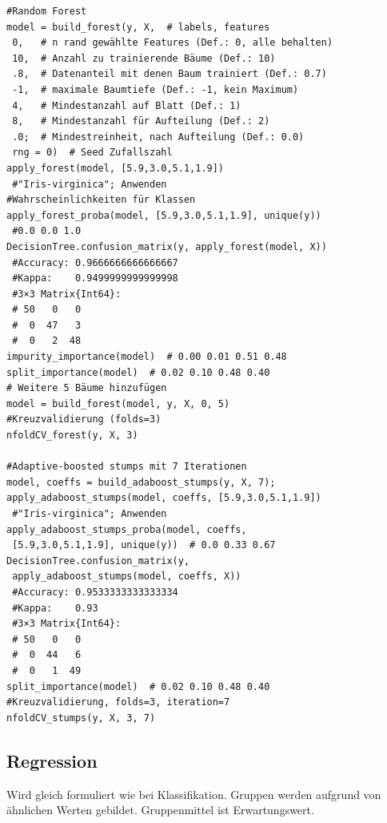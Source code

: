 \documentclass[10pt,twocolumn]{scrartcl}
\begin{document}
\begin{lstlisting}
#Random Forest
model = build_forest(y, X,  # labels, features
 0,   # n rand gewählte Features (Def.: 0, alle behalten)
 10,  # Anzahl zu trainierende Bäume (Def.: 10)
 .8,  # Datenanteil mit denen Baum trainiert (Def.: 0.7)
 -1,  # maximale Baumtiefe (Def.: -1, kein Maximum)
 4,   # Mindestanzahl auf Blatt (Def.: 1)
 8,   # Mindestanzahl für Aufteilung (Def.: 2)
 .0;  # Mindestreinheit, nach Aufteilung (Def.: 0.0)
 rng = 0)  # Seed Zufallszahl
apply_forest(model, [5.9,3.0,5.1,1.9])
 #"Iris-virginica"; Anwenden
#Wahrscheinlichkeiten für Klassen
apply_forest_proba(model, [5.9,3.0,5.1,1.9], unique(y))
 #0.0 0.0 1.0
DecisionTree.confusion_matrix(y, apply_forest(model, X))
 #Accuracy: 0.9666666666666667
 #Kappa:    0.9499999999999998
 #3×3 Matrix{Int64}:
 # 50   0   0
 #  0  47   3
 #  0   2  48
impurity_importance(model)  # 0.00 0.01 0.51 0.48
split_importance(model)  # 0.02 0.10 0.48 0.40
# Weitere 5 Bäume hinzufügen
model = build_forest(model, y, X, 0, 5)
#Kreuzvalidierung (folds=3)
nfoldCV_forest(y, X, 3)

#Adaptive-boosted stumps mit 7 Iterationen
model, coeffs = build_adaboost_stumps(y, X, 7);
apply_adaboost_stumps(model, coeffs, [5.9,3.0,5.1,1.9])
 #"Iris-virginica"; Anwenden
apply_adaboost_stumps_proba(model, coeffs,
 [5.9,3.0,5.1,1.9], unique(y))  # 0.0 0.33 0.67
DecisionTree.confusion_matrix(y,
 apply_adaboost_stumps(model, coeffs, X))
 #Accuracy: 0.9533333333333334
 #Kappa:    0.93
 #3×3 Matrix{Int64}:
 # 50   0   0
 #  0  44   6
 #  0   1  49
split_importance(model)  # 0.02 0.10 0.48 0.40
#Kreuzvalidierung, folds=3, iteration=7
nfoldCV_stumps(y, X, 3, 7)
\end{lstlisting}

\subsection{Regression}

Wird gleich formuliert wie bei Klassifikation. Gruppen werden aufgrund von ähnlichen Werten gebildet. Gruppenmittel ist Erwartungswert.
\end{document}

